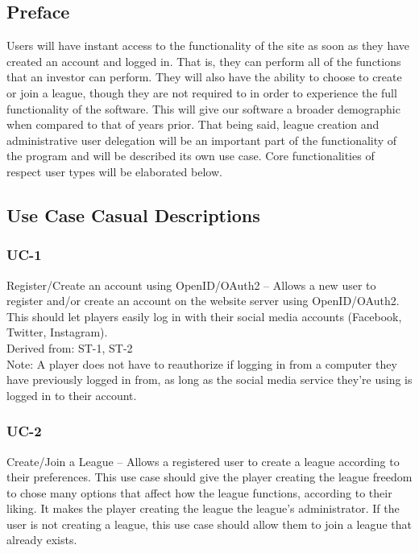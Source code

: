 \label{useCases}

\subsection{Preface}

Users will have instant access to the functionality of the site as soon as they
have created an account and logged in. That is, they can perform all of the functions
that an investor can perform. They will also have the ability to choose to create or
join a league, though they are not required to in order to experience the full
functionality of the software. This will give our software a broader demographic
when compared to that of years prior. That being said, league creation and
administrative user delegation will be an important part of the functionality of
the program and will be described its own use case. Core functionalities of respect
user types will be elaborated below.\\

\subsection{Use Case Casual Descriptions}

\subsubsection {UC-1} Register/Create an account using OpenID/OAuth2 – Allows a new user to register and/or create an account on the website server using OpenID/OAuth2. This should let players easily log in with their social media accounts (Facebook, Twitter, Instagram). \\

Derived from: ST-1, ST-2\\

Note: A player does not have to reauthorize if logging in from a computer they have previously logged in from, as long as the social media service they’re using is logged in to their account. 

\subsubsection {UC-2} Create/Join a League – Allows a registered user to create a league according to their preferences. This use case should give the player creating the league freedom to chose many options that affect how the league functions, according to their liking. It makes the player creating the league the league’s administrator. If the user is not creating a league, this use case should allow them to join a league that already exists. \\


